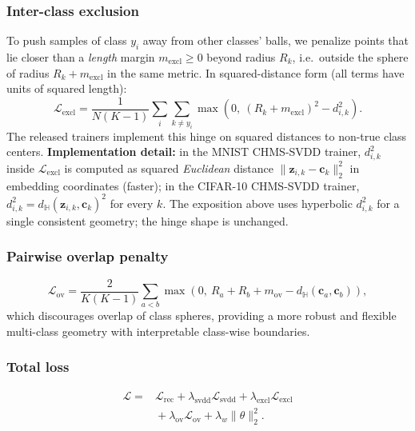 \documentclass[conference]{IEEEtran}
\begin{document}
\subsubsection{Inter-class exclusion}\label{sec:excl-margin}
To push samples of class $y_i$ away from other classes' balls, we penalize points that lie closer than a \emph{length} margin $m_{\text{excl}}\ge 0$ beyond radius $R_k$, i.e.\ outside the sphere of radius $R_k + m_{\text{excl}}$ in the same metric. In squared-distance form (all terms have units of squared length):
\begin{equation}
\mathcal{L}_{\text{excl}}=
\frac{1}{N(K-1)}
\sum_i\sum_{k\neq y_i}
\max\left(0,\ (R_k + m_{\text{excl}})^2 - d_{i,k}^2\right).
\label{eq:excl}
\end{equation}
The released trainers implement this hinge on squared distances to non-true class centers.
\textbf{Implementation detail:} in the MNIST CHMS-SVDD trainer, $d_{i,k}^2$ inside $\mathcal{L}_{\text{excl}}$ is computed as squared \emph{Euclidean} distance $\|\mathbf{z}_{i,k}-\mathbf{c}_k\|_2^2$ in embedding coordinates (faster); in the CIFAR-10 CHMS-SVDD trainer, $d_{i,k}^2=d_{\mathbb{H}}(\mathbf{z}_{i,k},\mathbf{c}_k)^2$ for every $k$.
The exposition above uses hyperbolic $d_{i,k}^2$ for a single consistent geometry; the hinge shape is unchanged.

\subsubsection{Pairwise overlap penalty}
\begin{equation}
\mathcal{L}_{\text{ov}}=
\frac{2}{K(K-1)}\sum_{a<b}
\max\left(
0,\ R_a + R_b + m_{\text{ov}} - d_{\mathbb{H}}(\mathbf{c}_a,\mathbf{c}_b)
\right),
\end{equation}
which discourages overlap of class spheres, providing a more robust and flexible multi-class geometry with interpretable class-wise boundaries.

\subsubsection{Total loss}
\begin{equation}
\begin{aligned}
\mathcal{L}={}&
\mathcal{L}_{\text{rec}}
+\lambda_{\text{svdd}}\mathcal{L}_{\text{svdd}}
+\lambda_{\text{excl}}\mathcal{L}_{\text{excl}}\\
&{}+\lambda_{\text{ov}}\mathcal{L}_{\text{ov}}
+\lambda_w\|\theta\|_2^2.
\end{aligned}
\end{equation}
\end{document}
